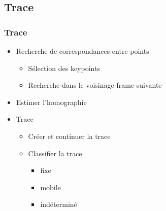 \subsection{Trace}
\begin{frame}
  \frametitle{Trace}
  \begin{itemize}
  \item Recherche de correspondances entre points
  	\begin{itemize}
  	\item Sélection des keypoints
  	\item Recherche dans le voisinage frame suivante
  	\end{itemize}
  \item Estimer l'homographie
  \item Trace
  	\begin{itemize}
  	\item Créer et continuer la trace
  	\item Classifier la trace
  	\begin{itemize}
  		\item fixe
  		\item mobile
  		\item indéterminé
  	\end{itemize}
  	\end{itemize}
  \end{itemize}
  


\end{frame}


